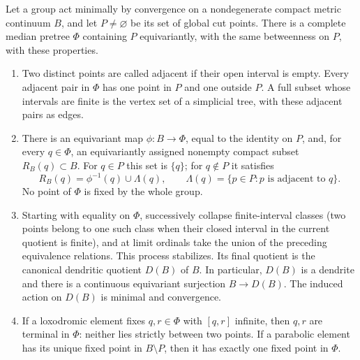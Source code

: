 \begin{proposition}\label{pret:package}
Let a group act minimally by convergence on a nondegenerate compact metric
continuum $B$, and let $P\ne\varnothing$ be its set of global cut points.
There is a complete median pretree $\Phi$ containing $P$ equivariantly,
with the same betweenness on $P$, with these properties.
\begin{enumerate}[label=\textup{(\roman*)}]
\item\label{pret:item-adjacency}
Two distinct points are called adjacent if their open interval is empty.
Every adjacent pair in $\Phi$ has one point in $P$ and one outside $P$.
A full subset whose intervals are finite is the vertex set of a simplicial
tree, with these adjacent pairs as edges.
\item\label{pret:item-support}
There is an equivariant map $\phi:B\to\Phi$, equal to the identity on
$P$, and, for every $q\in\Phi$, an equivariantly assigned nonempty compact
subset $R_B(q)\subset B$.  For $q\in P$ this set is $\{q\}$; for
$q\notin P$ it satisfies
\begin{equation}\label{pret:support}
 R_B(q)=\phi^{-1}(q)\cup\Lambda(q),
 \qquad \Lambda(q)=\{p\in P:p\text{ is adjacent to }q\}.
\end{equation}
No point of $\Phi$ is fixed by the whole group.
\item\label{pret:item-quotient}
Starting with equality on $\Phi$, successively collapse finite-interval
classes (two points belong to one such class when their closed interval
in the current quotient is finite), and at limit ordinals take the union
of the preceding equivalence
relations.  This process stabilizes.  Its final quotient is the canonical
dendritic quotient $D(B)$ of $B$.  In particular, $D(B)$ is a dendrite and
there is a continuous equivariant surjection $B\to D(B)$.  The induced
action on $D(B)$ is minimal and convergence.
\item\label{pret:item-fixed}
If a loxodromic element fixes $q,r\in\Phi$ with $[q,r]$ infinite, then
$q,r$ are terminal in $\Phi$: neither lies strictly between two points.
If a parabolic element has its unique fixed point in $B\setminus P$,
then it has exactly one fixed point in $\Phi$.
\end{enumerate}
\end{proposition}

